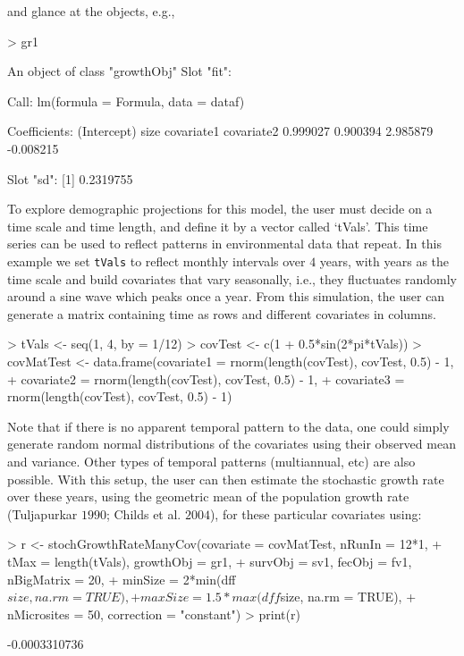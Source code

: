 \documentclass{article}
\begin{document}
and glance at the objects, e.g., 
\begin{Schunk}
\begin{Sinput}
> gr1
\end{Sinput}
\begin{Soutput}
An object of class "growthObj"
Slot "fit":

Call:
lm(formula = Formula, data = dataf)

Coefficients:
(Intercept)         size   covariate1   covariate2  
   0.999027     0.900394     2.985879    -0.008215  


Slot "sd":
[1] 0.2319755
\end{Soutput}
\end{Schunk}
To explore demographic projections for this model, the user must decide on
a time scale and time length, and define it by a vector called
`tVals'.  This time series can be used to reflect patterns in environmental data
that repeat.  In this example we set {\tt tVals} to reflect monthly intervals
over $4$ years, with years as the time scale and build covariates that vary
seasonally, i.e., they fluctuates randomly around a sine wave which peaks once a
year.  From this simulation, the user can generate a matrix containing time as
rows and different covariates in columns.
\begin{Schunk}
\begin{Sinput}
> tVals <- seq(1, 4, by = 1/12)
> covTest <- c(1 + 0.5*sin(2*pi*tVals))
> covMatTest <- data.frame(covariate1 = rnorm(length(covTest), covTest, 0.5) - 1, 
+                          covariate2 = rnorm(length(covTest), covTest, 0.5) - 1, 
+                          covariate3 = rnorm(length(covTest), covTest, 0.5) - 1)
\end{Sinput}
\end{Schunk}
Note that  if there is no apparent temporal pattern to the data, one could
simply generate random normal distributions of the covariates using their observed mean and variance. Other types of temporal patterns (multiannual, etc) are also possible. With this setup, the user can then estimate the stochastic growth rate over these years, using the geometric mean of the population growth rate (Tuljapurkar $1990$; Childs et al. $2004$), for these particular covariates using:
\begin{Schunk}
\begin{Sinput}
> r <- stochGrowthRateManyCov(covariate = covMatTest, nRunIn = 12*1, 
+                             tMax = length(tVals), growthObj = gr1, 
+                             survObj = sv1, fecObj = fv1, nBigMatrix = 20, 
+                             minSize = 2*min(dff$size, na.rm = TRUE), 
+                             maxSize = 1.5*max(dff$size, na.rm = TRUE), 
+                             nMicrosites = 50, correction = "constant")
> print(r)
\end{Sinput}
\begin{Soutput}
[1] -0.0003310736
\end{Soutput}
\end{Schunk}
\end{document}
